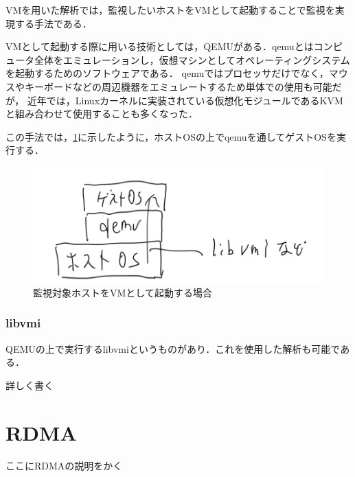 VMを用いた解析では，監視したいホストをVMとして起動することで監視を実現する手法である．

VMとして起動する際に用いる技術としては，QEMU\cite{qemu}がある．qemuとはコンピュータ全体をエミュレーションし，仮想マシンとしてオペレーティングシステムを起動するためのソフトウェアである．
qemuではプロセッサだけでなく，マウスやキーボードなどの周辺機器をエミュレートするため単体での使用も可能だが，
近年では，Linuxカーネルに実装されている仮想化モジュールであるKVM\cite{kvm}と組み合わせて使用することも多くなった．

この手法では，\ref{fig:vm_arch}に示したように，ホストOSの上でqemuを通してゲストOSを実行する．

\begin{figure}[htbp]
    \caption{監視対象ホストをVMとして起動する場合}
    \label{fig:vm_arch}
    \begin{center}
        \includegraphics[bb=0 0 1000 340,width=15cm]{img/tegaki/01_vm.png}
    \end{center}
\end{figure}

\subsubsection{libvmi}

QEMUの上で実行するlibvmi\cite{osti_1334968}というものがあり．これを使用した解析も可能である．

詳しく書く

\section{RDMA}

ここにRDMAの説明をかく

